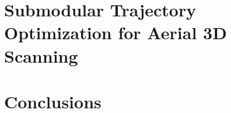 \documentclass{report}
\begin{document}
\chapter{Submodular Trajectory Optimization for Aerial 3D Scanning}









\chapter{Conclusions}



\appendix





\end{document}

